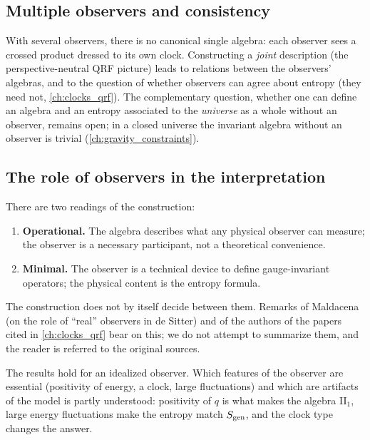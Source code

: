 \subsection{Multiple observers and consistency}

With several observers, there is no canonical single algebra: each observer sees a crossed product dressed to its own clock. Constructing a \emph{joint} description (the perspective-neutral QRF picture) leads to relations between the observers' algebras, and to the question of whether observers can agree about entropy (they need not, \cref{ch:clocks_qrf}). The complementary question, whether one can define an algebra and an entropy associated to the \emph{universe} as a whole without an observer, remains open; in a closed universe the invariant algebra without an observer is trivial (\cref{ch:gravity_constraints}).

\subsection{The role of observers in the interpretation}

There are two readings of the construction:
\begin{enumerate}
\item \textbf{Operational.} The algebra describes what any physical observer can measure; the observer is a necessary participant, not a theoretical convenience.
\item \textbf{Minimal.} The observer is a technical device to define gauge-invariant operators; the physical content is the entropy formula.
\end{enumerate}
The construction does not by itself decide between them. Remarks of Maldacena (on the role of ``real'' observers in de Sitter) and of the authors of the papers cited in \cref{ch:clocks_qrf} bear on this; we do not attempt to summarize them, and the reader is referred to the original sources.

\begin{keyidea}
The results hold for an idealized observer. Which features of the observer are essential (positivity of energy, a clock, large fluctuations) and which are artifacts of the model is partly understood: positivity of $q$ is what makes the algebra II$_1$, large energy fluctuations make the entropy match $S_{\mathrm{gen}}$, and the clock type changes the answer.
\end{keyidea}


